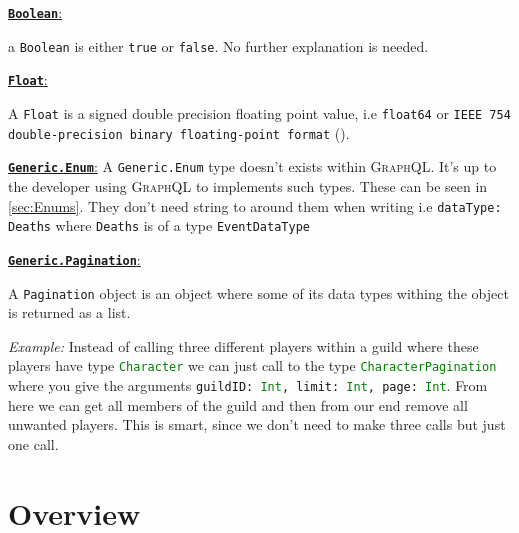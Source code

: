 \documentclass[10pt, a4paper]{memoir}
\numberwithin{equation}{section}
\theoremstyle{plain}
\theoremstyle{defp}
\theoremstyle{dotless}
\theoremstyle{definition}
\theoremstyle{dotless}
\theoremstyle{dotless}
\theoremstyle{defp}
\theoremstyle{defp}
\theoremstyle{be}          %
\theoremstyle{defp}
\newcommand\ttt[1]{\texttt{#1}}
\newcommand\tsc[1]{\textsc{#1}}
\newcommand\type[1]{\ttt{\textcolor{green}{#1}}}
\begin{document}
\medskip

\underline{\textbf{\ttt{Boolean}}:}

a \ttt{Boolean} is either \ttt{true} or \ttt{false}. No further explanation is needed.

\medskip

\underline{\textbf{\ttt{Float}}:}

A \ttt{Float} is a signed double precision floating point value, i.e \ttt{float64} or \ttt{IEEE 754 double-precision binary floating-point format} (\cite{floatsWiki}). 

\medskip

\underline{\textbf{\ttt{Generic.Enum}}:}
A \ttt{Generic.Enum} type doesn't exists within \tsc{GraphQL}. It's up to the developer using \tsc{GraphQL} to implements such types. These can be seen in \cref{sec:Enums}. They don't need string to around them when writing i.e \ttt{dataType: Deaths} where \ttt{Deaths} is of a type \ttt{EventDataType}

\medskip

\underline{\textbf{\ttt{Generic.Pagination}}:}

A \ttt{Pagination} object is an object where some of its data types withing the object is returned as a list.

\smallskip

\textit{Example:} Instead of calling three different players within a guild where these players have type \type{Character} we can just call to the type \type{CharacterPagination} where you give the arguments \ttt{guildID: \type{Int}, limit: \type{Int}, page: \type{Int}}. From here we can get all members of the guild and then from our end remove all unwanted players. This is smart, since we don't need to make three calls but just one call.

\newpage

\section{Overview}
\end{document}
